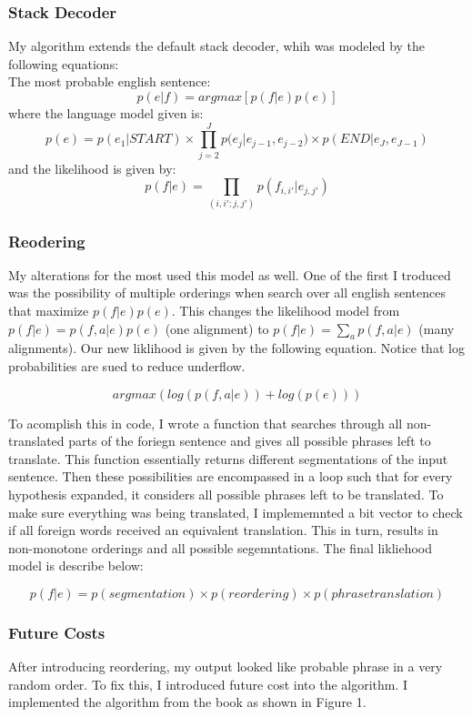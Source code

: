 \documentclass{article}
\begin{document}
\subsubsection{Stack Decoder}
\par
My algorithm extends the default stack decoder, whih was modeled by the following equations:
\\
The most probable english sentence:
$$ p(e|f) = argmax [p(f|e)p(e)]$$
where the language model given is:
$$ p(e) = p(e_1 | START) \times \prod_{j=2}^{J}{p(e_j|e_{j-1}}, e_{j-2}) \times p(END|e_J, e_{J-1})$$
and the likelihood is given by:
$$ p(f|e) = \prod_{(i,i';j,j')}{p(f_{i,i'} | e_{j,j'})} $$



\subsubsection{Reodering}
\par
My alterations for the most used this model as well. One of the first I troduced was the possibility of multiple orderings when search over all english sentences that maximize $p(f|e)p(e)$. This changes the likelihood model from $p(f|e) = p(f,a|e)p(e)$ (one alignment) to $p(f|e) = \sum_{a}{p(f,a|e)}$ (many alignments). Our new liklihood is given by the following equation. Notice that log probabilities are sued to reduce underflow. 

$$ argmax(log(p(f,a|e)) + log(p(e))) $$

To acomplish this in code, I wrote a function that searches through all non-translated parts of the foriegn sentence and gives all possible phrases left to translate. This function essentially returns different segmentations of the input sentence. Then these possibilities are encompassed in a loop such that for every hypothesis expanded, it considers all possible phrases left to be translated. To make sure everything was being translated, I implememnted a bit vector to check if all foreign words received an equivalent translation. This in turn, results in non-monotone orderings and all possible segemntations. The final likliehood model is describe below:

$$ p(f|e) = p(segmentation)\times p(reordering) \times p(phrase translation) $$

\subsubsection{Future Costs}
\par
After introducing reordering, my output looked like probable phrase in a very random order. To fix this, I introduced future cost into the algorithm. I implemented the algorithm from the book as shown in Figure 1. 
\end{document}
